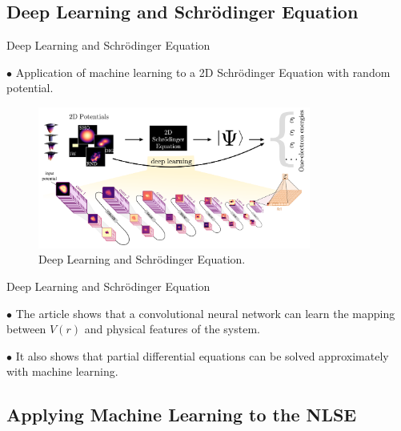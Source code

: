 \documentclass{beamer}
\begin{document}
\subsection{Deep Learning and Schr{\"o}dinger Equation}

\begin{frame}{Deep Learning and Schr{\"o}dinger Equation}

$\bullet$ Application of machine learning to a 2D Schr{\"o}dinger Equation with random potential.

\begin{figure}[Htb!]
\includegraphics[width=0.8\textwidth]{DPandSE.png}
\caption{\label{fig:DPandSE} Deep Learning and Schr{\"o}dinger Equation.}
\end{figure}

\end{frame}

\begin{frame}{Deep Learning and Schr{\"o}dinger Equation}

$\bullet$ The article shows that a convolutional neural network can learn the mapping between $V(r)$ and physical features of the system.

\vskip 1cm

$\bullet$ It also shows that partial differential equations can be solved approximately with machine learning.

\end{frame}

\subsection{Applying Machine Learning to the NLSE}
\end{document}
